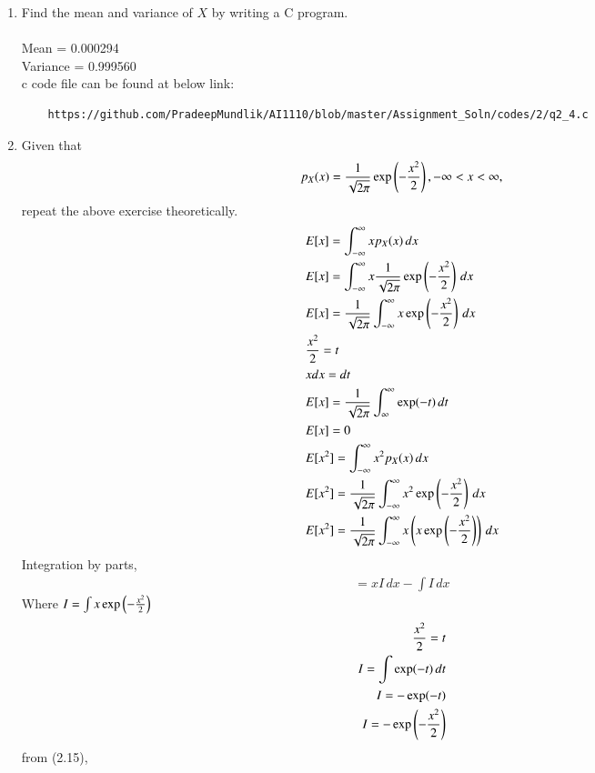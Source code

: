 \documentclass[journal,12pt,twocolumn]{IEEEtran}
\renewcommand\thesection{\arabic{section}}
\begin{document}
\begin{enumerate}[label=\thesection.\arabic*
,ref=\thesection.\theenumi]
\item Find the mean and variance of $X$ by writing a C program. \\
\solution \\
 Mean = 0.000294 \\
 Variance = 0.999560 \\
 c code file can be found at below link:
\begin{lstlisting}
	https://github.com/PradeepMundlik/AI1110/blob/master/Assignment_Soln/codes/2/q2_4.c
\end{lstlisting}
\item Given that 
\begin{align}
p_{X}(x) = \frac{1}{\sqrt{2\pi}}\exp\left(-\frac{x^2}{2}\right), -\infty < x < \infty,
\end{align}
repeat the above exercise theoretically.
\solution
\begin{align}
	&E[x] = \int_{-\infty}^{\infty} xp_X(x) \,dx \\
	&E[x] = \int_{-\infty}^{\infty} x\frac{1}{\sqrt{2\pi}}\exp\left(-\frac{x^2}{2}\right) \,dx \\
	&E[x] = \frac{1}{\sqrt{2\pi}}\int_{-\infty}^{\infty} x\exp\left(-\frac{x^2}{2}\right) \,dx \\
	&\frac{x^2}{2} = t \\
	&xdx = dt \\
	&E[x] = \frac{1}{\sqrt{2\pi}} \int_{\infty}^{\infty} \exp(-t) \, dt \\
	&E[x] = 0 \\
	&E[x^2] = \int_{-\infty}^{\infty} x^2p_X(x) \,dx \\
	&E[x^2] = \frac{1}{\sqrt{2\pi}}\int_{-\infty}^{\infty} x^2 \exp\left(-\frac{x^2}{2}\right)\,dx \\
	&E[x^2] = \frac{1}{\sqrt{2\pi}}\int_{-\infty}^{\infty} x\left(x \exp\left(-\frac{x^2}{2}\right)\right)\,dx \\
\end{align}
Integration by parts,
\begin{align}
	 = x I \,dx - \int I \,dx 
\end{align}
Where $I = \int x \exp\left(-\frac{x^2}{2}\right)$ \\
\begin{align}
	\frac{x^2}{2} = t \\
	I = \int \exp(-t) \, dt \\
	I = -\exp(-t) \\
	I = -\exp\left(-\frac{x^2}{2}\right) \\
\end{align}
from (2.15),
\begin{align}

\end{align}
\end{enumerate}
\end{document}
